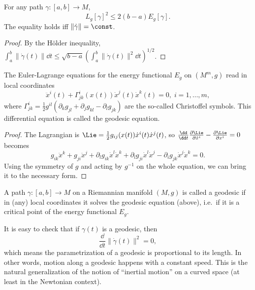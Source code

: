 \begin{lem}\label{length<energy lemma}
For any path $\gamma:[a,b]\to M$, 
\[L_g[\gamma]^2\leq 2(b-a)E_g[\gamma].\] The equality holds iff $\lVert \dot\gamma \rVert =\const$.
\end{lem}
\begin{proof}
    By the H\"older inequality, $\int_a^b \lVert \dot\gamma(t)\rVert \dd t\leq \sqrt{b-a} \left(\int_a^b \lVert \dot\gamma(t)\rVert^2\dd t\right)^{1/2}$.
\end{proof}

\begin{lem}
    The Euler-Lagrange equations for the energy functional $E_g$ on $(M^m,g)$ read in local coordinates 
    \[\ddot x^i(t)+\Gamma^i_{jk}(x(t))\dot x^j(t)\dot x^k(t)=0,\; i=1,\ldots,m,\]
    where $\Gamma^i_{jk}=\frac 12 g^{il}(\partial_k g_{jl}+\partial_jg_{kl}-\partial_l g_{jk})$ are the so-called Christoffel symbols. This differential equation is called the geodesic equation.
\end{lem}
\begin{proof}
    The Lagrangian is $\Lie=\frac12 g_{ij}(x(t))\dot x^i(t)\dot x^j(t)$, so $\frac{\dd}{\dd t}\frac{\partial\Lie}{\partial \dot x^i}-\frac{\partial \Lie}{\partial x^i}=0$ becomes 
    \[g_{ik}\ddot x^k+g_{ji}\ddot x^j+\partial_l g_{ik}\dot x^l\dot x^k+\partial_l g_{ji}\dot x^l\dot x^j-\partial_i g_{jk}\dot x^j\dot x^k=0.\]
    Using the symmetry of $g$ and acting by $g^{-1}$ on the whole equation, we can bring it to the necessary form.
\end{proof}

\begin{defn}[Geodesic]
    A path $\gamma:[a,b]\to M$ on a Riemannian manifold $(M,g)$ is called a geodesic if in (any) local coordinates it solves the geodesic equation (above), i.e.\ if it is a critical point of the energy functional $E_g$.
\end{defn}

It is easy to check that if $\gamma(t)$ is a geodesic, then 
\[\frac{\dd}{\dd t}\lVert \dot\gamma(t)\rVert^2=0,\]
which means the parametrization of a geodesic is proportional to its length. In other words, motion along a geodesic happens with a constant speed. This is the natural generalization of the notion of ``inertial motion'' on a curved space (at least in the Newtonian context).


